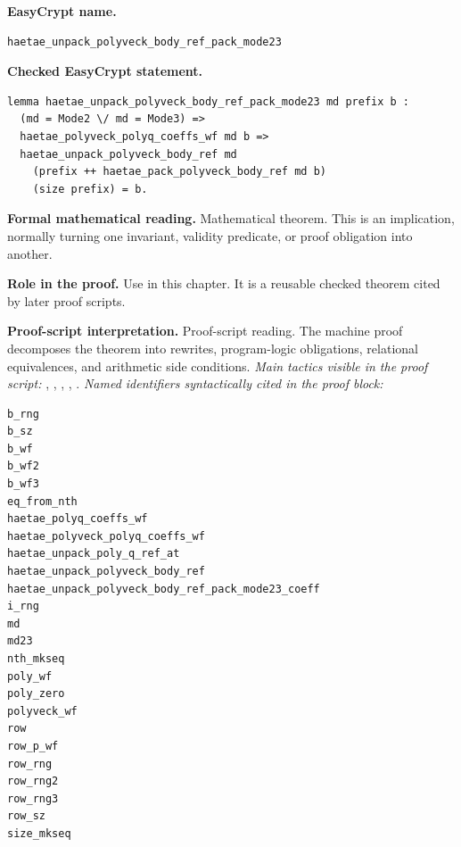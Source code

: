 \begin{formaltheorem}
\noindent\textbf{EasyCrypt name.}
\begin{lstlisting}[language=EasyCrypt,basicstyle=\ttfamily\scriptsize]
haetae_unpack_polyveck_body_ref_pack_mode23
\end{lstlisting}
\noindent\textbf{Checked EasyCrypt statement.}
\begin{lstlisting}[language=EasyCrypt,basicstyle=\ttfamily\scriptsize]
lemma haetae_unpack_polyveck_body_ref_pack_mode23 md prefix b :
  (md = Mode2 \/ md = Mode3) =>
  haetae_polyveck_polyq_coeffs_wf md b =>
  haetae_unpack_polyveck_body_ref md
    (prefix ++ haetae_pack_polyveck_body_ref md b)
    (size prefix) = b.
\end{lstlisting}
\noindent\textbf{Formal mathematical reading.}
Mathematical theorem. This is an implication, normally turning one invariant, validity predicate, or proof obligation into another.

\noindent\textbf{Role in the proof.}
Use in this chapter. It is a reusable checked theorem cited by later proof scripts.

\noindent\textbf{Proof-script interpretation.}
Proof-script reading. The machine proof decomposes the theorem into rewrites, program-logic obligations, relational equivalences, and arithmetic side conditions.
\emph{Main tactics visible in the proof script:} , , , , .
\emph{Named identifiers syntactically cited in the proof block:}
\begin{lstlisting}[language=EasyCrypt,basicstyle=\ttfamily\scriptsize]
b_rng
b_sz
b_wf
b_wf2
b_wf3
eq_from_nth
haetae_polyq_coeffs_wf
haetae_polyveck_polyq_coeffs_wf
haetae_unpack_poly_q_ref_at
haetae_unpack_polyveck_body_ref
haetae_unpack_polyveck_body_ref_pack_mode23_coeff
i_rng
md
md23
nth_mkseq
poly_wf
poly_zero
polyveck_wf
row
row_p_wf
row_rng
row_rng2
row_rng3
row_sz
size_mkseq
\end{lstlisting}

\end{formaltheorem}

